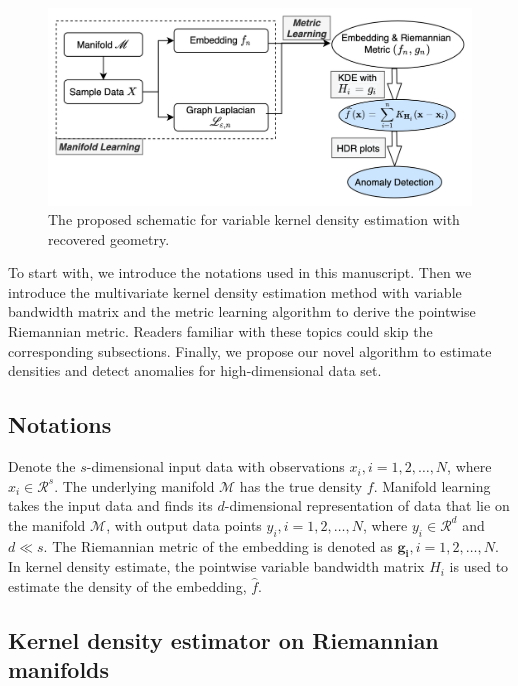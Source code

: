 \documentclass[11pt,a4paper,]{article}
\begin{document}
\begin{figure}

{\centering \includegraphics[width=0.95\linewidth]{figures/vkde} 

}

\caption{The proposed schematic for variable kernel density estimation with recovered geometry.}\label{fig:vkde}
\end{figure}

To start with, we introduce the notations used in this manuscript. Then we introduce the multivariate kernel density estimation method with variable bandwidth matrix and the metric learning algorithm to derive the pointwise Riemannian metric. Readers familiar with these topics could skip the corresponding subsections. Finally, we propose our novel algorithm to estimate densities and detect anomalies for high-dimensional data set.

\hypertarget{notations}{%
\subsection{Notations}\label{notations}}

Denote the \(s\)-dimensional input data with observations \(x_i, i = 1, 2, \dots, N\), where \(x_i \in \mathcal{R}^s\). The underlying manifold \(\mathcal{M}\) has the true density \(f\). Manifold learning takes the input data and finds its \(d\)-dimensional representation of data that lie on the manifold \(\mathcal{M}\), with output data points \(y_i, i = 1, 2, \dots, N\), where \(y_i \in \mathcal{R}^d\) and \(d \ll s\). The Riemannian metric of the embedding is denoted as \(\pmb{g_i}, i = 1, 2, \dots, N\). In kernel density estimate, the pointwise variable bandwidth matrix \(H_i\) is used to estimate the density of the embedding, \(\hat{f}\).

\hypertarget{kernel-density-estimator-on-riemannian-manifolds}{%
\subsection{Kernel density estimator on Riemannian manifolds}\label{kernel-density-estimator-on-riemannian-manifolds}}
\end{document}
